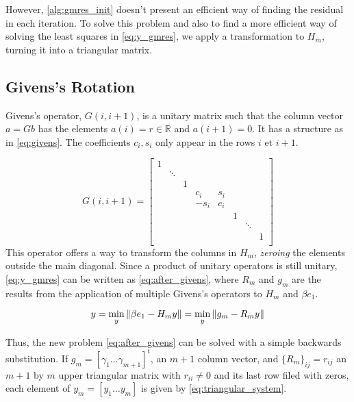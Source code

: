 However, \ref{alg:gmres_init} doesn't present an efficient way of finding the residual in each iteration. To solve this problem and also to find a more efficient way of solving the least squares in \ref{eq:y_gmres}, we apply a transformation to $H_{m}$, turning it into a triangular matrix.

\subsection{Givens's Rotation}

Givens's operator, $G(i,i+1)$, is a unitary matrix such that the column vector $a = Gb$ has the elements $a(i) = r \in \mathbb{R}$ and $a(i+1)=0$. It has a structure as in \ref{eq:givens}. The coefficients $c_{i},s_{i}$ only appear in the rows $i$ et $i+1$.

\begin{equation}\label{eq:givens}
    G(i,i+1)=
    \begin{bmatrix}
        1 &        &   &        &       &   &        &   \\
          & \ddots &   &        &       &   &        &   \\
          &        & 1 &        &       &   &        &   \\
          &        &   & c_{i}  & s_{i} &   &        &   \\
          &        &   & -s_{i} & c_{i} &   &        &   \\
          &        &   &        &       & 1 &        &   \\
          &        &   &        &       &   & \ddots &   \\
          &        &   &        &       &   &        & 1 \\
    \end{bmatrix}
\end{equation}
This operator offers a way to transform the columns in $H_{m}$, \textit{zeroing} the elements outside the main diagonal. Since a product of unitary operators is still unitary, \ref{eq:y_gmres} can be written as \ref{eq:after_givens}, where $R_{m}$ and $g_{m}$ are the results from the application of multiple Givens's operators to $H_{m}$ and $\beta e_{1}$.

\begin{equation}\label{eq:after_givens}
    y = \min_{y} \left\lVert\beta e_{1} - H_{m}y\right\rVert = \min_{y} \left\lVert g_{m} - R_{m}y\right\rVert
\end{equation}


Thus, the new problem \ref{eq:after_givens} can be solved with a simple backwards substitution. If $g_{m} = [\gamma_{1} \dots \gamma_{m+1}]^{t}$, an $m+1$ column vector, and $\{ R_{m} \}_{ij} = r_{ij}$ an $m+1$ by $m$ upper triangular matrix with $r_{ii} \neq 0$ and its last row filed with zeros, each element of $y_{m} = [y_{1} \dots y_{m}]$ is given by \ref{eq:triangular_system}.

